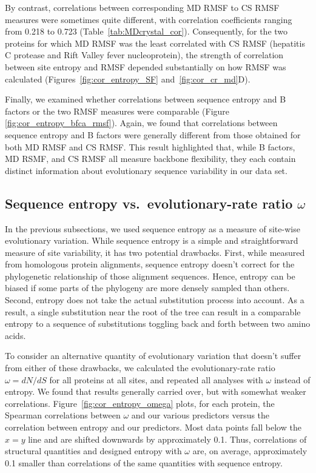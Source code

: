 \documentclass[smallextended]{svjour3}
\begin{document}
By contrast, correlations between corresponding MD RMSF to CS RMSF measures were sometimes quite different, with correlation coefficients ranging from 0.218 to 0.723 (Table~\ref{tab:MDcrystal_cor}). Consequently, for the two proteins for which MD RMSF was the least correlated with CS RMSF (hepatitis C protease and Rift Valley fever nucleoprotein), the strength of correlation between site entropy and RMSF depended substantially on how RMSF was calculated (Figures~\ref{fig:cor_entropy_SF} and~\ref{fig:cor_cr_md}D).

Finally, we examined whether correlations between sequence entropy and B factors or the two RMSF measures were comparable (Figure \ref{fig:cor_entropy_bfca_rmsf}). Again, we found that correlations between sequence entropy and B factors were generally different from those obtained for both MD RMSF and CS RMSF. This result highlighted that, while B factors, MD RSMF, and CS RMSF all measure backbone flexibility, they each contain distinct information about evolutionary sequence variability in our data set.


\subsection*{Sequence entropy vs.\ evolutionary-rate ratio $\omega$}

In the previous subsections, we used sequence entropy as a measure of site-wise evolutionary variation. While sequence entropy is a simple and straightforward measure of site variability, it has two potential drawbacks. First, while measured from homologous protein alignments, sequence entropy doesn't correct for the phylogenetic relationship of those alignment sequences. Hence, entropy can be biased if some parts of the phylogeny are more densely sampled than others. Second, entropy does not take the actual substitution process into account. As a result, a single substitution near the root of the tree can result in a comparable entropy to a sequence of substitutions toggling back and forth between two amino acids.

To consider an alternative quantity of evolutionary variation that doesn't suffer from either of these drawbacks, we calculated the evolutionary-rate ratio $\omega=dN/dS$ for all proteins at all sites, and repeated all analyses with $\omega$ instead of entropy. We found that results generally carried over, but with somewhat weaker correlations. Figure~\ref{fig:cor_entropy_omega} plots, for each protein, the Spearman correlations between $\omega$ and our various predictors versus the correlation between entropy and our predictors. Most data points fall below the $x=y$ line and are shifted downwards by approximately 0.1. Thus, correlations of structural quantities and designed entropy with $\omega$ are, on average, approximately 0.1 smaller than correlations of the same quantities with sequence entropy.
\end{document}
